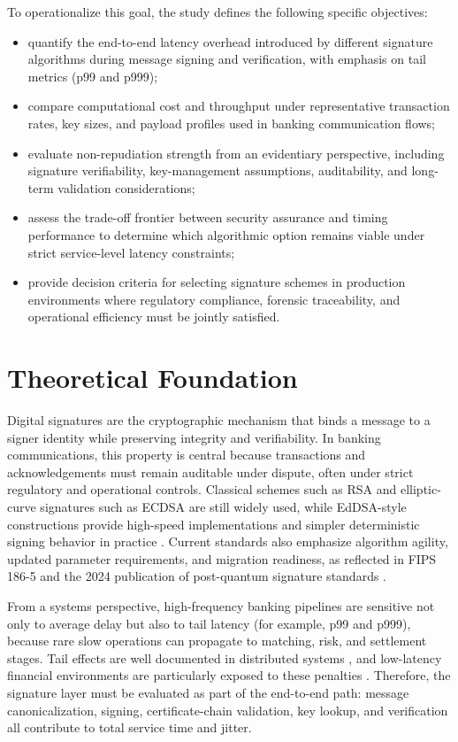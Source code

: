 \documentclass[12pt]{article}
\begin{document}
To operationalize this goal, the study defines the following specific objectives:
\begin{itemize}
	\item quantify the end-to-end latency overhead introduced by different signature algorithms during message signing and verification, with emphasis on tail metrics (p99 and p999);
	\item compare computational cost and throughput under representative transaction rates, key sizes, and payload profiles used in banking communication flows;
	\item evaluate non-repudiation strength from an evidentiary perspective, including signature verifiability, key-management assumptions, auditability, and long-term validation considerations;
	\item assess the trade-off frontier between security assurance and timing performance to determine which algorithmic option remains viable under strict service-level latency constraints;
	\item provide decision criteria for selecting signature schemes in production environments where regulatory compliance, forensic traceability, and operational efficiency must be jointly satisfied.
\end{itemize}

\section{Theoretical Foundation}
Digital signatures are the cryptographic mechanism that binds a message to a signer identity while preserving integrity and verifiability. In banking communications, this property is central because transactions and acknowledgements must remain auditable under dispute, often under strict regulatory and operational controls. Classical schemes such as RSA \cite{rsa1978} and elliptic-curve signatures such as ECDSA \cite{ecdsa2001} are still widely used, while EdDSA-style constructions provide high-speed implementations and simpler deterministic signing behavior in practice \cite{bernstein2012}. Current standards also emphasize algorithm agility, updated parameter requirements, and migration readiness, as reflected in FIPS 186-5 \cite{fips1865} and the 2024 publication of post-quantum signature standards \cite{fips204,fips205}.

From a systems perspective, high-frequency banking pipelines are sensitive not only to average delay but also to tail latency (for example, p99 and p999), because rare slow operations can propagate to matching, risk, and settlement stages. Tail effects are well documented in distributed systems \cite{dean2013}, and low-latency financial environments are particularly exposed to these penalties \cite{hasbrouck2013}. Therefore, the signature layer must be evaluated as part of the end-to-end path: message canonicalization, signing, certificate-chain validation, key lookup, and verification all contribute to total service time and jitter.
\end{document}
